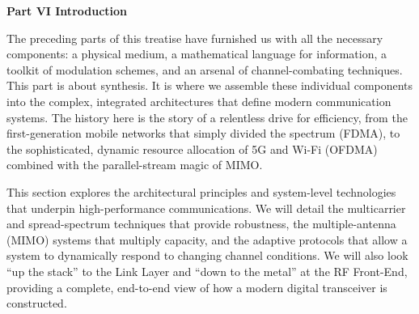 \newpage
\thispagestyle{empty}

\vspace*{3cm}

\begin{center}
{\Large\lorettadisplay\bfseries Part VI Introduction}
\end{center}

\vspace{2cm}

The preceding parts of this treatise have furnished us with all the necessary components: a physical medium, a mathematical language for information, a toolkit of modulation schemes, and an arsenal of channel-combating techniques. This part is about synthesis. It is where we assemble these individual components into the complex, integrated architectures that define modern communication systems. The history here is the story of a relentless drive for efficiency, from the first-generation mobile networks that simply divided the spectrum (FDMA), to the sophisticated, dynamic resource allocation of 5G and Wi-Fi (OFDMA) combined with the parallel-stream magic of MIMO.

\vspace{1em}

This section explores the architectural principles and system-level technologies that underpin high-performance communications. We will detail the multicarrier and spread-spectrum techniques that provide robustness, the multiple-antenna (MIMO) systems that multiply capacity, and the adaptive protocols that allow a system to dynamically respond to changing channel conditions. We will also look ``up the stack'' to the Link Layer and ``down to the metal'' at the RF Front-End, providing a complete, end-to-end view of how a modern digital transceiver is constructed.

\vspace*{\fill}
\newpage
